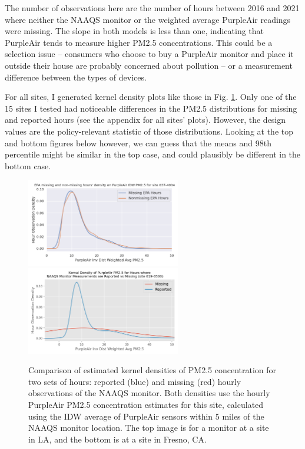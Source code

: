 \documentclass[12pt]{article}
\begin{document}
The number of observations here are the number of hours between 2016 and 2021 where neither the NAAQS monitor or the weighted average PurpleAir readings were missing. The slope in both models is less than one, indicating that PurpleAir tends to measure higher PM2.5 concentrations. This could be a selection issue -- consumers who choose to buy a PurpleAir monitor and place it outside their house are probably concerned about pollution -- or a measurement difference between the types of devices.

 For all sites, I generated kernel density plots like those in Fig. \ref{fig:missing-density_019-0500}. Only one of the 15 sites I tested had noticeable differences in the PM2.5 distributions for missing and reported hours (see the appendix for all sites' plots). However, the design values are the policy-relevant statistic of those distributions. Looking at the top and bottom figures below however, we can guess that the means and 98th percentile might be similar in the top case, and could plausibly be different in the bottom case.

 
\begin{figure}
\centering
\includegraphics[width=0.6\textwidth]{site-037-4004_epa-pa-missing-density.png}
\includegraphics[width=0.6\textwidth]{appendix/site_plots/site-019-0500_epa-pa-missing-density.png}
\caption{Comparison of estimated kernel densities of PM2.5 concentration for two sets of hours: reported (blue) and missing (red) hourly observations of the NAAQS monitor. Both densities use the hourly PurpleAir PM2.5 concentration estimates for this site, calculated using the IDW average of PurpleAir sensors within 5 miles of the NAAQS monitor location. The top image is for a monitor at a site in LA, and the bottom is at a site in Fresno, CA.}
\label{fig:missing-density_019-0500}
\end{figure}
\end{document}
